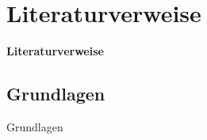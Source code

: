 \documentclass["WS\space 16-17\space -\space LaTeX-Kurs\space -\space Praesentation\space -\space 3.tex"]{subfiles}
\begin{document}
\section{Literaturverweise}
\begin{frame}[c]
	\begin{center}
		\LARGE \textbf{Literaturverweise}
	\end{center}
\end{frame}
\subsection{Grundlagen}
\begin{frame}[c]
	\begin{center}
		\large Grundlagen
	\end{center}
\end{frame}
\end{document}
